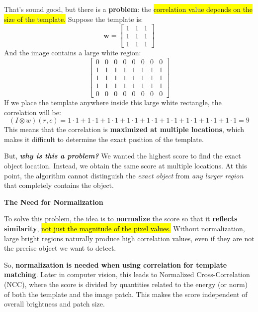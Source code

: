 \highspace
That's sound good, but there is a \textbf{problem}: the \hl{correlation value depends on the size of the template.} Suppose the template is:
\begin{equation*}
    \mathbf{w} = \begin{bmatrix}
        1 & 1 & 1 \\
        1 & 1 & 1 \\
        1 & 1 & 1
    \end{bmatrix}
\end{equation*}
And the image contains a large white region:
\begin{equation*}
    \begin{bmatrix}
        0 & 0 & 0 & 0 & 0 & 0 & 0 & 0 \\
        1 & 1 & 1 & 1 & 1 & 1 & 1 & 1 \\
        1 & 1 & 1 & 1 & 1 & 1 & 1 & 1 \\
        1 & 1 & 1 & 1 & 1 & 1 & 1 & 1 \\
        0 & 0 & 0 & 0 & 0 & 0 & 0 & 0
    \end{bmatrix}
\end{equation*}
If we place the template anywhere inside this large white rectangle, the correlation will be:
\begin{equation*}
    \left(I \otimes w\right)\left(r,c\right) = 1 \cdot 1 + 1 \cdot 1 + 1 \cdot 1 + 1 \cdot 1 + 1 \cdot 1 + 1 \cdot 1 + 1 \cdot 1 + 1 \cdot 1 + 1 \cdot 1 = 9
\end{equation*}
This means that the correlation is \textbf{maximized at multiple locations}, which makes it difficult to determine the exact position of the template.

\highspace
But, \textbf{\emph{why is this a problem?}} We wanted the highest score to find the exact object location. Instead, we obtain the same score at multiple locations. At this point, the algorithm cannot distinguish the \emph{exact object} from \emph{any larger region} that completely contains the object.

\highspace
\begin{flushleft}
    \textcolor{Green3}{ \textbf{The Need for Normalization}}
\end{flushleft}
To solve this problem, the idea is to \textbf{normalize} the score so that it \textbf{reflects similarity}, \hl{not just the magnitude of the pixel values.} Without normalization, large bright regions naturally produce high correlation values, even if they are not the precise object we want to detect.

\highspace
So, \textbf{normalization is needed when using correlation for template matching}. Later in computer vision, this leads to Normalized Cross-Correlation (NCC), where the score is divided by quantities related to the energy (or norm) of both the template and the image patch. This makes the score independent of overall brightness and patch size.
